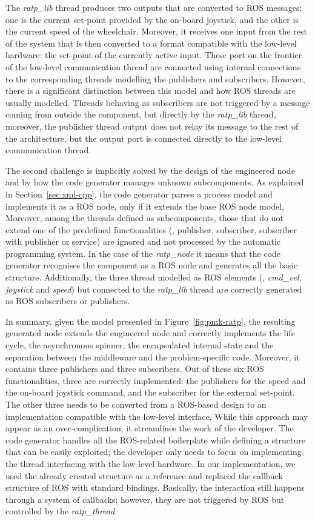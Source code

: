 The \textit{ratp\_lib} thread produces two outputs that are converted to ROS messages: one is the current set-point provided by the on-board joystick, and the other is the current speed of the wheelchair. Moreover, it receives one input from the rest of the system that is then converted to a format compatible with the low-level hardware: the set-point of the currently active input. These port on the frontier of the low-level communication thread are connected using internal connections to the corresponding threads modelling the publishers and subscribers. However, there is a significant distinction between this model and how ROS threads are usually modelled. Threads behaving as subscribers are not triggered by a message coming from outside the component, but directly by the \textit{ratp\_lib} thread, moreover, the publisher thread output does not relay its message to the rest of the architecture, but the output port is connected directly to the low-level communication thread.

The second challenge is implicitly solved by the design of the engineered node and by how the code generator manages unknown subcomponents.  As explained in Section~\ref{sec:xml-cpp}, the code generator parses a process model and implements it as a ROS node, only if it extends the base ROS node model, Moreover, among the threads defined as subcomponents, those that do not extend one of the predefined functionalities (\ie, publisher, subscriber, subscriber with publisher or service) are ignored and not processed by the automatic programming system. In the case of the \textit{ratp\_node} it means that the code generator recognises the component as a ROS node and generates all the basic structure. Additionally, the three thread modelled as ROS elements (\ie, \textit{cmd\_vel}, \textit{joystick} and \textit{speed}) but connected to the \textit{ratp\_lib} thread are correctly generated as ROS subscribers or publishers. 

In summary, given the model presented in Figure~\ref{fig:pmk-ratp}, the resulting generated node extends the engineered node and correctly implements the life cycle, the asynchronous spinner, the encapsulated internal state and the separation between the middleware and the problem-specific code. Moreover, it contains three publishers and three subscribers. Out of these six ROS functionalities, three are correctly implemented: the publishers for the speed and the on-board joystick command, and the subscriber for the external set-point. The other three needs to be converted from a ROS-based design to an implementation compatible with the low-level interface. While this approach may appear as an over-complication, it streamlines the work of the developer. The code generator handles all the ROS-related boilerplate while defining a structure that can be easily exploited; the developer only needs to focus on implementing the thread interfacing with the low-level hardware. In our implementation, we used the already created structure as a reference and replaced the callback structure of ROS with standard bindings. Basically, the interaction still happens through a system of callbacks; however, they are not triggered by ROS but controlled by the \textit{ratp\_thread}.

